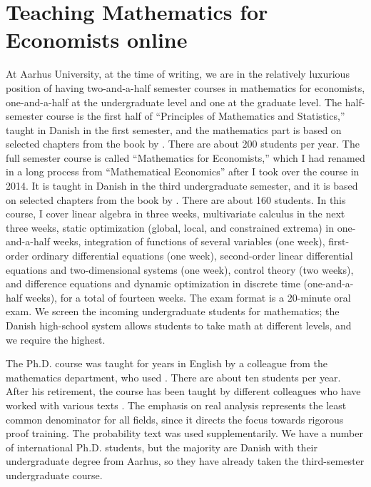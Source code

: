 \documentclass[10pt]{article}
\begin{document}
\section{Teaching Mathematics for Economists online}

At Aarhus University, at the time of writing, we are in the relatively luxurious position of having two-and-a-half semester courses in mathematics for economists, one-and-a-half at the undergraduate level and one at the graduate level. The half-semester course is the first half of ``Principles of Mathematics and Statistics,'' taught in Danish in the first semester, and the mathematics part is based on selected chapters from the book by \cite{Sydsaeter2022}. There are about 200 students per year. The full semester course is called ``Mathematics for Economists,'' which I had renamed in a long process from ``Mathematical Economics'' after I took over the course in 2014. It is taught in Danish in the third undergraduate semester, and it is based on selected chapters from the book by \cite{Sydsaeter2008}. There are about 160 students. In this course, I cover linear algebra in three weeks, multivariate calculus in the next three weeks, static optimization (global, local, and constrained extrema) in one-and-a-half weeks, integration of functions of several variables (one week), first-order ordinary differential equations (one week), second-order linear differential equations and two-dimensional systems (one week), control theory (two weeks), and difference equations and dynamic optimization in discrete time (one-and-a-half weeks), for a total of fourteen weeks. The exam format is a 20-minute oral exam. We screen the incoming undergraduate students for mathematics; the Danish high-school system allows students to take math at different levels, and we require the highest.

The Ph.D. course was taught for years in English by a colleague from the mathematics department, who used \cite{Rudin1976}. There are about ten students per year. After his retirement, the course has been taught by different colleagues who have worked with various texts \citep{Boyd2004,Johnsonbaugh2010,Ok2007,Resnick2014}. The emphasis on real analysis represents the least common denominator for all fields, since it directs the focus towards rigorous proof training. The probability text was used supplementarily. We have a number of international Ph.D. students, but the majority are Danish with their undergraduate degree from Aarhus, so they have already taken the third-semester undergraduate course.
\end{document}
